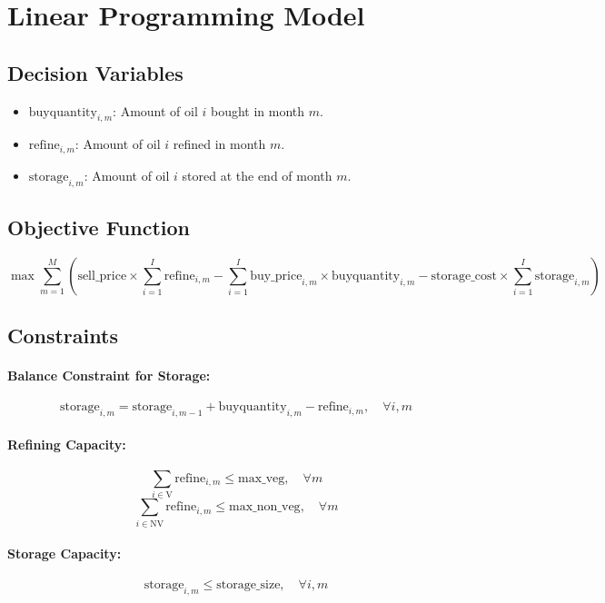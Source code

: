 \documentclass{article}
\begin{document}
\section*{Linear Programming Model}

\subsection*{Decision Variables}
\begin{itemize}
    \item $ \text{buyquantity}_{i,m} $: Amount of oil $ i $ bought in month $ m $.
    \item $ \text{refine}_{i,m} $: Amount of oil $ i $ refined in month $ m $.
    \item $ \text{storage}_{i,m} $: Amount of oil $ i $ stored at the end of month $ m $.
\end{itemize}

\subsection*{Objective Function}
\[
\max \sum_{m=1}^{M} \left( \text{sell\_price} \times \sum_{i=1}^{I} \text{refine}_{i,m} - \sum_{i=1}^{I} \text{buy\_price}_{i,m} \times \text{buyquantity}_{i,m} - \text{storage\_cost} \times \sum_{i=1}^{I} \text{storage}_{i,m} \right)
\]

\subsection*{Constraints}

\paragraph{Balance Constraint for Storage:}
\[
\text{storage}_{i,m} = \text{storage}_{i,m-1} + \text{buyquantity}_{i,m} - \text{refine}_{i,m}, \quad \forall i, m
\]

\paragraph{Refining Capacity:}
\[
\sum_{i \in \text{V}} \text{refine}_{i,m} \leq \text{max\_veg}, \quad \forall m
\]
\[
\sum_{i \in \text{NV}} \text{refine}_{i,m} \leq \text{max\_non\_veg}, \quad \forall m
\]

\paragraph{Storage Capacity:}
\[
\text{storage}_{i,m} \leq \text{storage\_size}, \quad \forall i, m
\]
\end{document}
